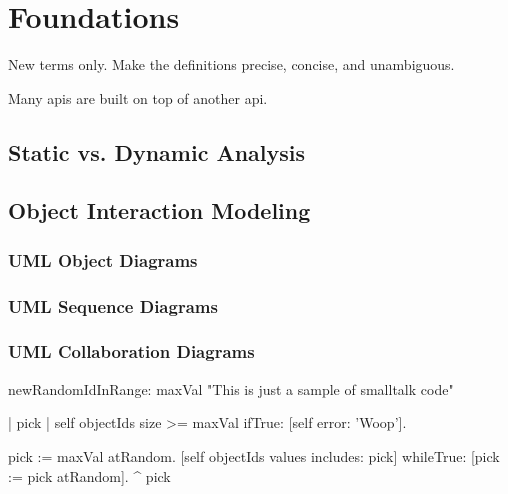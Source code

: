 \chapter{Foundations}
\label{c:Foundations}

New terms only. Make the definitions precise, concise, and unambiguous.

Many \acp{api} are built on top of another \ac{api}.

\section{Static vs. Dynamic Analysis}

\section{Object Interaction Modeling}
\subsection{UML Object Diagrams}
\subsection{UML Sequence Diagrams}
\subsection{UML Collaboration Diagrams}

\begin{smalltalk}[float=htbp,caption=Smalltalk Sample]
newRandomIdInRange: maxVal
	"This is just a sample of smalltalk code"
	
	| pick |
	self objectIds size >= maxVal ifTrue: [self error: 'Woop'].
	
	pick := maxVal atRandom.
	[self objectIds values includes: pick] 
		whileTrue: [pick := pick atRandom].
	^  pick
\end{smalltalk}
